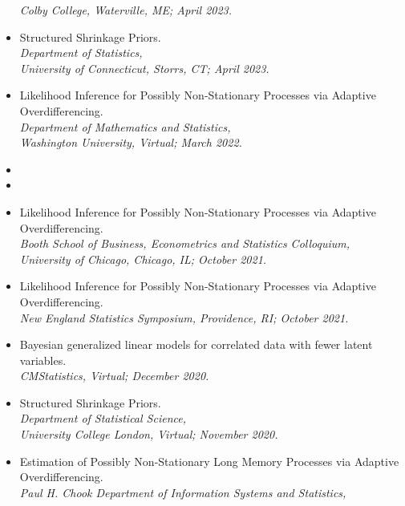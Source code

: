 \documentclass[11pt]{article}
\newcommand{\tab}{\hspace*{2em}}
\begin{document}
\begin{itemize}
	\tab \emph{Colby College, Waterville, ME; April 2023.} \vspace{-2mm}
	\item[] Structured Shrinkage Priors. \\
	\tab \emph{Department of Statistics,} \\
	\tab \emph{University of Connecticut, Storrs, CT; April 2023.} \vspace{-2mm}
	\item[] Likelihood Inference for Possibly Non-Stationary Processes via Adaptive Overdifferencing. \\
	\tab \emph{Department of Mathematics and Statistics,} \\
	\tab \emph{Washington University, Virtual; March 2022.} \vspace{-2mm}
	\item[]
	\item[]
	\item[] Likelihood Inference for Possibly Non-Stationary Processes via Adaptive Overdifferencing. \\
	\tab \emph{Booth School of Business, Econometrics and Statistics Colloquium,} \\
	\tab \emph{University of Chicago, Chicago, IL; October 2021.} \vspace{-2mm}
	\item[] Likelihood Inference for Possibly Non-Stationary Processes via Adaptive Overdifferencing. \\
	\tab \emph{New England Statistics Symposium, Providence, RI; October 2021. }\vspace{-2mm}
	\item[] Bayesian generalized linear models for correlated data with fewer latent variables. \\
	\tab \emph{CMStatistics, Virtual; December 2020. } \vspace{-2mm}
	\item[] Structured Shrinkage Priors. \\
	\tab \emph{Department of Statistical Science,}\\ 
	\tab \emph{University College London, Virtual; November 2020.} \vspace{-2mm}
	\item[] Estimation of Possibly Non-Stationary Long Memory Processes via Adaptive \\
	Overdifferencing. \\
	\tab \emph{Paul H. Chook Department of Information Systems and Statistics,}\\ 

\end{itemize}
\end{document}
